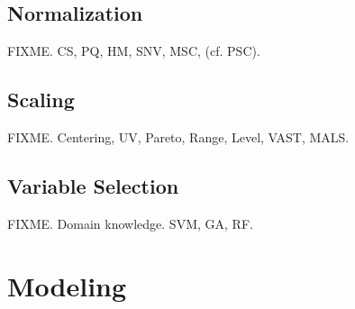 \subsection{Normalization}

\begin{doublespace}
FIXME. CS, PQ, HM, SNV, MSC, (cf. PSC).
\end{doublespace}

\subsection{Scaling}

\begin{doublespace}
FIXME. Centering, UV, Pareto, Range, Level, VAST, MALS.
\end{doublespace}

\subsection{Variable Selection}

\begin{doublespace}
FIXME. Domain knowledge. SVM, GA, RF.
\end{doublespace}

\section{Modeling}

